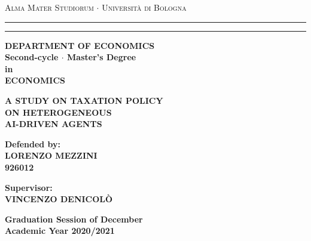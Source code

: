 \begin{titlepage}
    \textwidth=400pt
    \begin{center}
    {{\large{\textsc{Alma Mater Studiorum $\cdot$ Universit\`a di
    Bologna}}}} 
    \rule[0.1cm]{400pt}{0.1mm}
    \rule[0.5cm]{400pt}{0.6mm}
    {\small{\bf DEPARTMENT OF ECONOMICS\\
        Second-cycle $\cdot$ Master's Degree \\ in \\ ECONOMICS }}
    \end{center}
    \vspace{15mm}
    \begin{center}
    {\Large{\bf A STUDY ON TAXATION POLICY}}\\
    \vspace{3mm}
    {\Large{\bf   ON HETEROGENEOUS }}\\
    \vspace{3mm}
    {\Large{\bf  AI-DRIVEN AGENTS}}\\
    \end{center}
    \vspace{40mm}
    \par
    \noindent
    \begin{minipage}[t]{0.47\textwidth}
    {\large{\bf Defended by:\\
    LORENZO MEZZINI\\
    926012}} 
    \end{minipage}
    \hfill
    \begin{minipage}[t]{0.47\textwidth}\raggedleft
    {\large{\bf Supervisor:\\
    VINCENZO DENICOL\`O}}
    \end{minipage}
    \vspace{20mm}
    \begin{center}
    {\large{\bf Graduation Session of December\\
    Academic Year 2020/2021 }}
    \end{center}
\end{titlepage}
